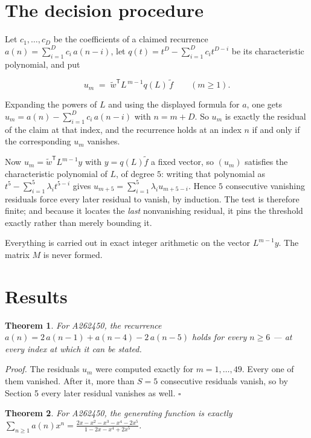 \documentclass[11pt]{article}
\newtheorem{theorem}{Theorem}
\theoremstyle{definition}
\begin{document}
\section{The decision procedure}

Let $c_1,\dots,c_D$ be the coefficients of a claimed recurrence $a(n) = \sum_{i=1}^{D} c_i\,a(n-i)$, let $q(t) = t^{D} - \sum_{i=1}^{D} c_i t^{D-i}$ be its characteristic polynomial, and put

\[u_m \;=\; \tilde w^{\mathsf T} L^{\,m-1} q(L)\,\tilde f \qquad (m \ge 1).\]

Expanding the powers of $L$ and using the displayed formula for $a$, one gets $u_m = a(n) - \sum_{i=1}^{D} c_i\,a(n-i)$ with $n = m + D$. So $u_m$ is exactly the residual of the claim at that index, and the recurrence holds at an index $n$ if and only if the corresponding $u_m$ vanishes.

Now $u_m = \tilde w^{\mathsf T} L^{m-1} y$ with $y = q(L)\tilde f$ a fixed vector, so $(u_m)$ satisfies the characteristic polynomial of $L$, of degree $5$: writing that polynomial as $t^{5} - \sum_{i=1}^{5} \lambda_i t^{5-i}$ gives $u_{m+5} = \sum_{i=1}^{5} \lambda_i u_{m+5-i}$. Hence $5$ consecutive vanishing residuals force every later residual to vanish, by induction. The test is therefore finite; and because it locates the {\itshape last} nonvanishing residual, it pins the threshold exactly rather than merely bounding it.

Everything is carried out in exact integer arithmetic on the vector $L^{m-1}y$. The matrix $M$ is never formed.

\section{Results}

\begin{theorem} For A262450, the recurrence $a(n) = 2\,a(n-1) + a(n-4) - 2\,a(n-5)$ holds for every $n \ge 6$ --- at every index at which it can be stated.\end{theorem}

{\itshape Proof.} The residuals $u_m$ were computed exactly for $m = 1,\dots,49$. Every one of them vanished. After it, more than $S = 5$ consecutive residuals vanish, so by Section 5 every later residual vanishes as well. $\square$

\begin{theorem} For A262450, the generating function is exactly $\sum_{n\ge 1} a(n)x^n = \frac{2x - x^{2} - x^{3} - x^{4} - 2x^{5}}{1 - 2x - x^{4} + 2x^{5}}$.\end{theorem}
\end{document}
